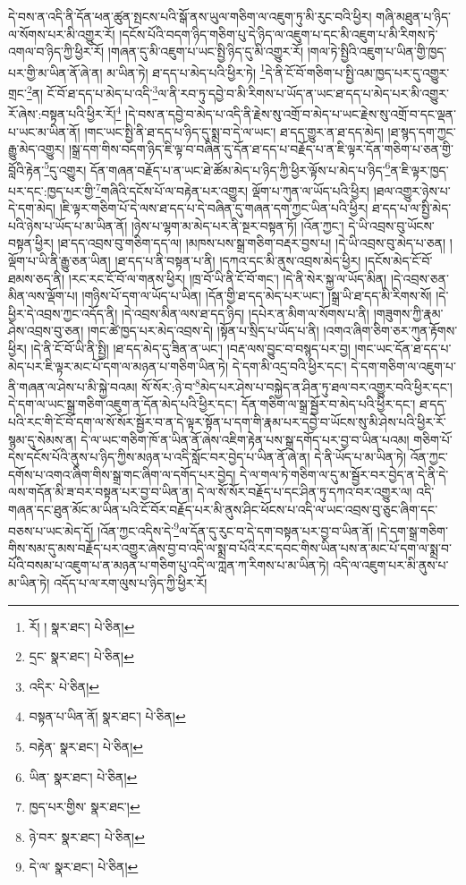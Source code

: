 དེ་བས་ན་འདི་ནི་དོན་ཕན་ཚུན་སྤངས་པའི་སྒོ་ནས་ཡུལ་གཅིག་ལ་འཇུག་ཏུ་མི་རུང་བའི་ཕྱིར། གཞི་མཐུན་པ་ཉིད་ལ་སོགས་པར་མི་འགྱུར་རོ། །དངོས་པོའི་བདག་ཉིད་གཅིག་པུ་དེ་ཉིད་ལ་འཇུག་པ་དང་མི་འཇུག་པ་མི་རིགས་ཏེ་འགལ་བ་ཉིད་ཀྱི་ཕྱིར་རོ། །གཞན་དུ་མི་འཇུག་པ་ཡང་སྤྱི་ཉིད་དུ་མི་འགྱུར་རོ། །གལ་ཏེ་སྤྱིའི་འཇུག་པ་ཡིན་གྱི་ཁྱད་པར་གྱི་མ་ཡིན་ནོ་ཞེ་ན། མ་ཡིན་ཏེ། ཐ་དད་པ་མེད་པའི་ཕྱིར་ཏེ། \footnote{རོ། །   སྣར་ཐང་།  པེ་ཅིན། }དེ་ནི་ངོ་བོ་གཅིག་པ་སྤྱི་འམ་ཁྱད་པར་དུ་འགྱུར་གྲང་\footnote{དྲང་  སྣར་ཐང་།  པེ་ཅིན། }ན། ངོ་བོ་ཐ་དད་པ་མེད་པ་འདི་\footnote{འདིར་  པེ་ཅིན། }ལ་ནི་རབ་ཏུ་དབྱེ་བ་མི་རིགས་པ་ཡོད་ན་ཡང་ཐ་དད་པ་མེད་པར་མི་འགྱུར་རོ་ཞེས་:བསྟན་པའི་ཕྱིར་རོ།\footnote{བསྟན་པ་ཡིན་ནོ།  སྣར་ཐང་།  པེ་ཅིན། } །དེ་བས་ན་དབྱེ་བ་མེད་པ་འདི་ནི་རྗེས་སུ་འགྲོ་བ་མེད་པ་ཡང་རྗེས་སུ་འགྲོ་བ་དང་ལྡན་པ་ཡང་མ་ཡིན་ནོ། །གང་ཡང་སྤྱི་ནི་ཐ་དད་པ་ཉིད་དུ་སྨྲ་བ་དེ་ལ་ཡང་། ཐ་དད་གྱུར་ན་ཐ་དད་མེད། །ཐ་སྙད་དག་ཀྱང་རྒྱུ་མེད་འགྱུར། །སྒྲ་དག་གིས་བདག་ཉིད་ཇི་ལྟ་བ་བཞིན་དུ་དོན་ཐ་དད་པ་བརྗོད་པ་ན་ཇི་ལྟར་དོན་གཅིག་པ་ཅན་གྱི་བློའི་རྟེན་\footnote{བརྟེན་  སྣར་ཐང་།  པེ་ཅིན། }དུ་འགྱུར། དོན་གཞན་བརྗོད་པ་ན་ཡང་ཐེ་ཚོམ་མེད་པ་ཉིད་ཀྱི་ཕྱིར་ལྟོས་པ་མེད་པ་ཉིད་\footnote{ཡིན་  སྣར་ཐང་།  པེ་ཅིན། }ན་ཇི་ལྟར་ཁྱད་པར་དང་:ཁྱད་པར་གྱི་\footnote{ཁྱད་པར་གྱིས་  སྣར་ཐང་། }གཞིའི་དངོས་པོ་ལ་བརྟེན་པར་འགྱུར། ལྡོག་པ་ཀུན་ལ་ཡོད་པའི་ཕྱིར། །ཐལ་འགྱུར་ཉེས་པ་དེ་དག་མེད། །ཇི་ལྟར་གཅིག་པོ་དེ་ལས་ཐ་དད་པ་དེ་བཞིན་དུ་གཞན་དག་ཀྱང་ཡིན་པའི་ཕྱིར། ཐ་དད་པ་ལ་སྤྱི་མེད་པའི་ཉེས་པ་ཡོད་པ་མ་ཡིན་ནོ། །ཉེས་པ་ལྷག་མ་མེད་པར་ནི་སྔར་བསྟན་ཏོ། །འོན་ཀྱང་། དེ་ཡི་འབྲས་བུ་ཡོངས་བསྟན་ཕྱིར། །ཐ་དད་འབྲས་བུ་གཅིག་དད་ལ། །མཁས་པས་སྒྲ་གཅིག་བརྡར་བྱས་པ། །དེ་ཡི་འབྲས་བུ་མེད་པ་ཅན། །ལྡོག་པ་ཡི་ནི་རྒྱུ་ཅན་ཡིན། །ཐ་དད་པ་ནི་བསྟན་པ་ནི། །དཀའ་དང་མི་ནུས་འབྲས་མེད་ཕྱིར། །དངོས་མེད་ངོ་བོ་ཐམས་ཅད་ནི། །རང་རང་ངོ་བོ་ལ་གནས་ཕྱིར། །ཁྲ་བོ་ཡི་ནི་ངོ་བོ་གང་། །དེ་ནི་སེར་སྐྱ་ལ་ཡོད་མིན། །དེ་འབྲས་ཅན་མིན་ལས་ལྡོག་པ། །གཉིས་པོ་དག་ལ་ཡོད་པ་ཡིན། །དོན་གྱི་ཐ་དད་མེད་པར་ཡང་། །སྒྲ་ཡི་ཐ་དད་མི་རིགས་སོ། །དེ་ཕྱིར་དེ་འབྲས་ཀྱང་འདོད་ནི། །དེ་འབྲས་མིན་ལས་ཐ་དད་ཉིད། །དཔེར་ན་མིག་ལ་སོགས་པ་ནི། །གཟུགས་ཀྱི་རྣམ་ཤེས་འབྲས་བུ་ཅན། །གང་ཚེ་ཁྱད་པར་མེད་འབྲས་དེ། །སྟོན་པ་སྲིད་པ་ཡོད་པ་ནི། །འགའ་ཞིག་ཅིག་ཅར་ཀུན་རྟོགས་ཕྱིར། །དེ་ནི་ངོ་བོ་ཡི་ནི་སྤྱི། །ཐ་དད་མེད་དུ་ཟིན་ན་ཡང་། །བརྡ་ལས་བྱུང་བ་བསྙད་པར་བྱ། །གང་ཡང་དོན་ཐ་དད་པ་མེད་པར་ཇི་ལྟར་མང་པོ་དག་ལ་མཉན་པ་གཅིག་ཡིན་ཏེ། དེ་དག་མི་འདྲ་བའི་ཕྱིར་དང་། དེ་དག་གཅིག་ལ་འཇུག་པ་ནི་གཞན་ལ་ཤེས་པ་མི་སྐྱེ་བའམ། སོ་སོར་:ཉེ་བ་\footnote{ཉེ་བར་  སྣར་ཐང་།  པེ་ཅིན། }མེད་པར་ཤེས་པ་བསྐྱེད་ན་ཤིན་ཏུ་ཐལ་བར་འགྱུར་བའི་ཕྱིར་དང་། དེ་དག་ལ་ཡང་སྒྲ་གཅིག་འཇུག་ན་དོན་མེད་པའི་ཕྱིར་དང་། དོན་གཅིག་ལ་སྒྲ་སྦྱོར་བ་མེད་པའི་ཕྱིར་དང་། ཐ་དད་པའི་རང་གི་ངོ་བོ་དག་ལ་སོ་སོར་སྦྱོར་བ་ན་དེ་ལྟར་སྟོན་པ་དག་གི་རྣམ་པར་དབྱེ་བ་ཡོངས་སུ་མི་ཤེས་པའི་ཕྱིར་རོ་སྙམ་དུ་སེམས་ན། དེ་ལ་ཡང་གཅིག་ཁོ་ན་ཡིན་ནོ་ཞེས་འཇིག་རྟེན་པས་སྒྲ་དགོད་པར་བྱ་བ་ཡིན་པའམ། གཅིག་པོ་དེས་དངོས་པོའི་ནུས་པ་ཉིད་ཀྱིས་མཉན་པ་འདི་སློང་བར་བྱེད་པ་ཡིན་ནོ་ཞེ་ན། དེ་ནི་ཡོད་པ་མ་ཡིན་ཏེ། འོན་ཀྱང་དགོས་པ་འགའ་ཞིག་གིས་སྒྲ་གང་ཞིག་ལ་དགོད་པར་བྱེད། དེ་ལ་གལ་ཏེ་གཅིག་ལ་དུ་མ་སྦྱོར་བར་བྱེད་ན་དེ་ནི་དེ་ལས་གདོན་མི་ཟ་བར་བསྟན་པར་བྱ་བ་ཡིན་ན། དེ་ལ་སོ་སོར་བརྗོད་པ་དང་ཤིན་ཏུ་དཀའ་བར་འགྱུར་ལ། འདི་གཞན་དང་ཐུན་མོང་མ་ཡིན་པའི་ངོ་བོར་བརྗོད་པར་མི་ནུས་ཤིང་ཕོངས་པ་འདི་ལ་ཡང་འབྲས་བུ་ཅུང་ཞིག་དང་བཅས་པ་ཡང་མེད་དོ། །འོན་ཀྱང་འདིས་དེ་\footnote{དེ་ལ་  སྣར་ཐང་།  པེ་ཅིན། }ལ་དོན་དུ་རུང་བ་དེ་དག་བསྟན་པར་བྱ་བ་ཡིན་ནོ། །དེ་དག་སྒྲ་གཅིག་གིས་སམ་དུ་མས་བརྗོད་པར་འགྱུར་ཞེས་བྱ་བ་འདི་ལ་སྨྲ་བ་པོའི་རང་དབང་གིས་ཡིན་པས་ན་མང་པོ་དག་ལ་སྨྲ་བ་པོའི་བསམ་པ་འཇུག་པ་ན་མཉན་པ་གཅིག་པུ་འདི་ལ་ཀླན་ཀ་རིགས་པ་མ་ཡིན་ཏེ། འདི་ལ་འཇུག་པར་མི་ནུས་པ་མ་ཡིན་ཏེ། འདོད་པ་ལ་རག་ལུས་པ་ཉིད་ཀྱི་ཕྱིར་རོ། 